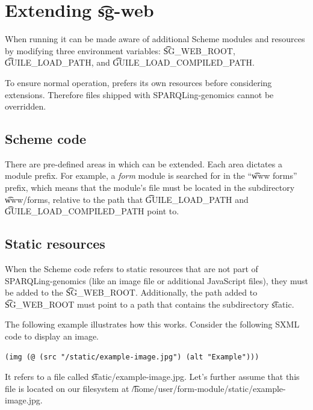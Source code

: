 \section{Extending \t{sg-web}}

  When running  it can be made aware of additional Scheme modules and
  resources by modifying three environment variables:
  \t{SG\_WEB\_ROOT}, \t{GUILE\_LOAD\_PATH}, and \t{GUILE\_LOAD\_COMPILED\_PATH}.

  To ensure normal operation,  prefers its own resources
  before considering extensions.  Therefore files shipped with SPARQLing-genomics
  cannot be overridden.

\subsection{Scheme code}

  There are pre-defined areas in which  can be extended.  Each
  area dictates a module prefix.  For example, a \emph{form} module is searched
  for in the ``\t{www forms}'' prefix, which means that the module's file must
  be located in the subdirectory \t{www/forms}, relative to the path that
  \t{GUILE\_LOAD\_PATH} and \t{GUILE\_LOAD\_COMPILED\_PATH} point to.

\subsection{Static resources}

  When the Scheme code refers to static resources that are not part of
  SPARQLing-genomics (like an image file or additional JavaScript files),
  they must be added to the \t{SG\_WEB\_ROOT}.  Additionally, the path added to
  \t{SG\_WEB\_ROOT} must point to a path that contains the subdirectory
  \t{static}.

  The following example illustrates how this works.  Consider the following
  SXML code to display an image.
\begin{siderules}
\begin{verbatim}
(img (@ (src "/static/example-image.jpg") (alt "Example")))
\end{verbatim}
\end{siderules}

  It refers to a file called \t{static/example-image.jpg}.  Let's further
  assume that this file is located on our filesystem at
  \t{/home/user/form-module/static/example-image.jpg}.


